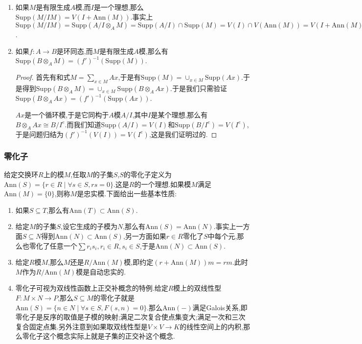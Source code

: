 \begin{enumerate}
\begin{proof}
		任取$S^{-1}R$支集中的素理想$S^{-1}P$,那么存在元$a/s,a\in P,s\in S$使得$\mathrm{Ann}(a/s)\subseteq S^{-1}P$.我们来验证$\mathrm{Ann}(a)\subseteq P$:如果$r\in R$满足$ra=0$,那么有$(r/1)(a/s)=0$,于是$r/1\in S^{-1}P$,于是$r\in P$.
		
		反过来任取$R$的和$S$无交的素理想$P$,假设它在支集中,即存在$\mathrm{Ann}(a)\subseteq P$,我们来验证$\mathrm{Ann}(a/1)\subseteq S^{-1}P$:如果$r/s\in S^{-1}R$满足$ra/s=0$,此即存在$s'\in S$使得$s'ra=0\in P$,于是$s'r\in P$,而从$s'$和$P$不交得到$r\in P$,于是$r/s\in S^{-1}P$.
	\end{proof}
	\item 如果$M$是有限生成$A$模,而$I$是一个理想,那么$\mathrm{Supp}(M/IM)=V(I+\mathrm{Ann}(M))$.事实上$\mathrm{Supp}(M/IM)=\mathrm{Supp}(A/I\otimes_AM)=\mathrm{Supp}(A/I)\cap\mathrm{Supp}(M)=V(I)\cap V(\mathrm{Ann}(M))=V(I+\mathrm{Ann}(M))$.
	\item 如果$f:A\to B$是环同态,而$M$是有限生成$A$模,那么有$\mathrm{Supp}(B\otimes_AM)=(f')^{-1}(\mathrm{Supp}(M))$.
	\begin{proof}
		
		首先有和式$M=\sum_{x\in M}Ax$,于是有$\mathrm{Supp}(M)=\cup_{x\in M}\mathrm{Supp}(Ax)$.于是得到$\mathrm{Supp}(B\otimes_AM)=\cup_{x\in M}\mathrm{Supp}(B\otimes_AAx)$.于是我们只需验证$\mathrm{Supp}(B\otimes_AAx)=(f')^{-1}(\mathrm{Supp}(Ax))$.
		
		$Ax$是一个循环模,于是它同构于$A$模$A/I$,其中$I$是某个理想,那么有$B\otimes_AAx\cong B/I^e$.而我们知道$\mathrm{Supp}(A/I)=V(I)$和$\mathrm{Supp}(B/I^e)=V(I^e)$,于是问题归结为$(f')^{-1}(V(I))=V(I^e)$,这是我们证明过的.
	\end{proof}
\end{enumerate}
\subsubsection{零化子}

给定交换环$R$上的模$M$,任取$M$的子集$S$,$S$的零化子定义为$\mathrm{Ann}(S)=\{r\in R\mid\forall s\in S,rs=0\}$.这是$R$的一个理想.如果模$M$满足$\mathrm{Ann}(M)=\{0\}$,则称$M$是忠实模.下面给出一些基本性质:
\begin{enumerate}
	\item 如果$S\subseteq T$,那么有$\mathrm{Ann}(T)\subset\mathrm{Ann}(S)$.
	\item 给定$M$的子集$S$,设它生成的子模为$N$,那么有$\mathrm{Ann}(S)=\mathrm{Ann}(N)$.事实上一方面$S\subseteq N$得到$\mathrm{Ann}(N)\subset\mathrm{Ann}(S)$,另一方面如果$r\in R$零化了$S$中每个元,那么也零化了任意一个$\sum r_is_i,r_i\in R,s_i\in S$,于是$\mathrm{Ann}(N)\subset\mathrm{Ann}(S)$.
	\item 给定$R$模$M$,那么$M$还是$R/\mathrm{Ann}(M)$模,即约定$(r+\mathrm{Ann}(M))m=rm$.此时$M$作为$R/\mathrm{Ann}(M)$模是自动忠实的.
	\item 零化子可视为双线性函数上正交补概念的特例.给定$R$模上的双线性型$F:M\times N\to P$,那么$S\subseteq M$的零化子就是$\mathrm{Ann}(S)=\{n\in N\mid\forall s\in S,F(s,n)=0\}$.那么$\mathrm{Ann}(-)$满足Galois关系,即零化子是反序的取值是子模的映射;满足二次复合使点集变大;满足一次和三次复合固定点集.另外注意到如果取双线性型是$V\times V\to K$的线性空间上的内积,那么零化子这个概念实际上就是子集的正交补这个概念.
\end{enumerate}
